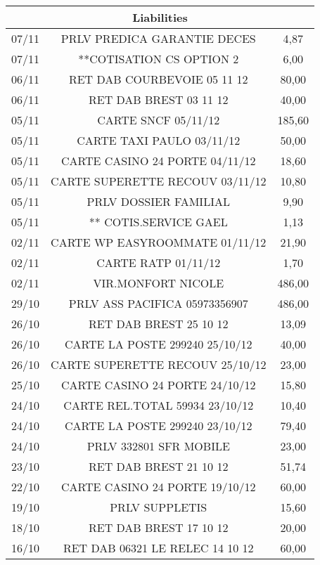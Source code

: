 \begin{longtable}{|c|c|c|}
\hline
\multicolumn{3}{|c|}{Liabilities} \\
\hline
07/11 & PRLV   PREDICA GARANTIE DECES & 4,87 \\
\hline
07/11 & **COTISATION CS OPTION 2 & 6,00 \\
\hline
06/11 & RET DAB COURBEVOIE     05 11 12 & 80,00 \\
\hline
06/11 & RET DAB BREST          03 11 12 & 40,00 \\
\hline
05/11 & CARTE SNCF             05/11/12 & 185,60 \\
\hline
05/11 & CARTE TAXI PAULO       03/11/12 & 50,00 \\
\hline
05/11 & CARTE CASINO 24 PORTE  04/11/12 & 18,60 \\
\hline
05/11 & CARTE SUPERETTE RECOUV 03/11/12 & 10,80 \\
\hline
05/11 & PRLV   DOSSIER FAMILIAL & 9,90 \\
\hline
05/11 & ** COTIS.SERVICE GAEL & 1,13 \\
\hline
02/11 & CARTE WP EASYROOMMATE  01/11/12 & 21,90 \\
\hline
02/11 & CARTE RATP             01/11/12 & 1,70 \\
\hline
02/11 & VIR.MONFORT NICOLE & 486,00 \\
\hline
29/10 & PRLV   ASS PACIFICA  05973356907 & 486,00 \\
\hline
26/10 & RET DAB BREST          25 10 12 & 13,09 \\
\hline
26/10 & CARTE LA POSTE 299240  25/10/12 & 40,00 \\
\hline
26/10 & CARTE SUPERETTE RECOUV 25/10/12 & 23,00 \\
\hline
25/10 & CARTE CASINO 24 PORTE  24/10/12 & 15,80 \\
\hline
24/10 & CARTE REL.TOTAL 59934  23/10/12 & 10,40 \\
\hline
24/10 & CARTE LA POSTE 299240  23/10/12 & 79,40 \\
\hline
24/10 & PRLV 332801   SFR MOBILE & 23,00 \\
\hline
23/10 & RET DAB BREST          21 10 12 & 51,74 \\
\hline
22/10 & CARTE CASINO 24 PORTE  19/10/12 & 60,00 \\
\hline
19/10 & PRLV   SUPPLETIS & 15,60 \\
\hline
18/10 & RET DAB BREST          17 10 12 & 20,00 \\
\hline
16/10 & RET DAB 06321 LE RELEC 14 10 12 & 60,00 \\

\end{longtable}
